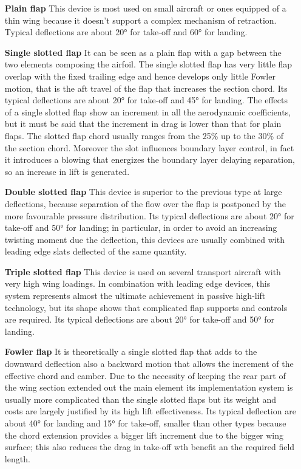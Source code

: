 \begin{itemize}
\item [\textbf{Plain flap}] This device is most used on small aircraft or ones equipped of a thin wing because it doesn't support a complex mechanism of retraction. Typical deflections are about 20° for take-off and 60° for landing.
\item [\textbf{Single slotted flap}]  It can be seen as a plain flap with a gap between the two elements composing the airfoil. The single slotted flap has very little flap overlap with the fixed trailing edge and hence develops only little Fowler motion, that is the aft travel of the flap that increases the section chord. Its typical deflections are about 20° for take-off and 45° for landing.
%
The effects of a single slotted flap show an increment in all the aerodynamic coefficients, but it must be said that the increment in drag is lower than that for plain flaps. The slotted flap chord usually ranges from the 25\% up to the 30\% of the section chord. Moreover the slot influences boundary layer control, in fact it introduces a blowing that energizes the boundary layer delaying separation, so an increase in lift is generated.
\item[\textbf{Double slotted flap}] This device is superior to the previous type at large deflections, because separation of the flow over the flap is postponed by the more favourable pressure distribution. Its typical deflections are about 20° for take-off and 50° for landing; in particular, in order to avoid an increasing twisting moment due the deflection, this devices are usually combined with leading edge slats deflected of the same quantity. 
\item[\textbf{Triple slotted flap}] This device is used on several transport aircraft with very high wing loadings. In combination with leading edge devices, this system represents almost the ultimate achievement in passive high-lift technology, but its shape shows that complicated flap supports and controls are required. Its typical deflections are about 20° for take-off and 50° for landing.
\item[\textbf{Fowler flap}]  It is theoretically a single slotted flap that adds to the downward deflection also a backward motion that allows the increment of the effective chord and camber.
%
Due to the necessity of keeping the rear part of the wing section extended out the main element its implementation system is usually more complicated than the single slotted flaps but its weight and costs are largely justified by its high lift effectiveness. Its typical deflection are about 40° for landing and 15° for take-off, smaller than other types because the chord extension provides a bigger lift increment due to the bigger wing surface; this also reduces the drag in take-off wth benefit an the required field length.

\end{itemize}
